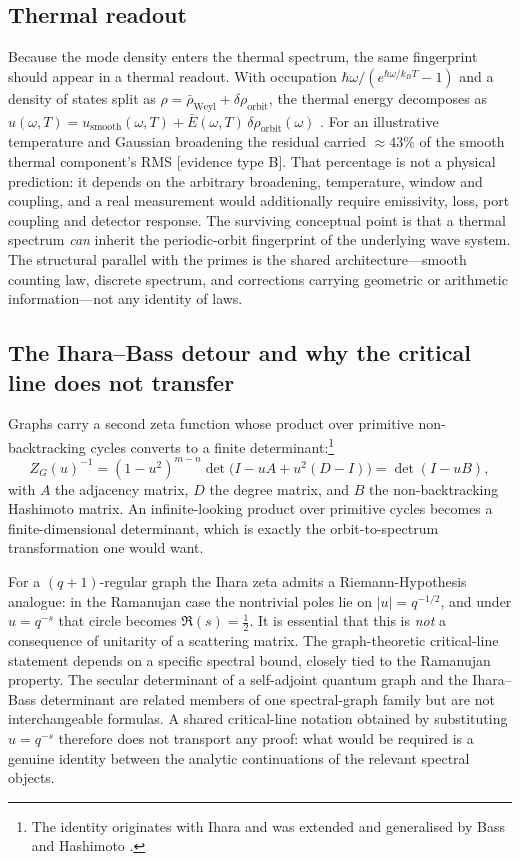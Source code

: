 \documentclass[11pt]{article}
\begin{document}
\subsection{Thermal readout}

Because the mode density enters the thermal spectrum, the same fingerprint should appear
in a thermal readout. With occupation $\hbar\omega/(e^{\hbar\omega/k_BT}-1)$ and a
density of states split as $\rho=\bar\rho_{\mathrm{Weyl}}+\delta\rho_{\mathrm{orbit}}$,
the thermal energy decomposes as
$u(\omega,T)=u_{\mathrm{smooth}}(\omega,T)+\bar E(\omega,T)\,\delta\rho_{\mathrm{orbit}}(\omega)$
\cite{planck1901}. For an illustrative temperature and Gaussian broadening the residual
carried $\approx43\%$ of the smooth thermal component's RMS [evidence type B]. That
percentage is not a physical prediction: it depends on the arbitrary broadening,
temperature, window and coupling, and a real measurement would additionally require
emissivity, loss, port coupling and detector response. The surviving conceptual point is
that a thermal spectrum \emph{can} inherit the periodic-orbit fingerprint of the
underlying wave system. The structural parallel with the primes is the shared
architecture---smooth counting law, discrete spectrum, and corrections carrying geometric
or arithmetic information---not any identity of laws.

\subsection{The Ihara--Bass detour and why the critical line does not transfer}

Graphs carry a second zeta function whose product over primitive non-backtracking cycles
converts to a finite determinant:\footnote{The identity originates with Ihara \cite{ihara1966}
and was extended and generalised by Bass \cite{bass1992} and Hashimoto \cite{hashimoto1989}.}
\begin{equation}
Z_G(u)^{-1} = (1-u^2)^{m-n}\det\!\big(I-uA+u^2(D-I)\big)
= \det(I-uB),
\end{equation}
with $A$ the adjacency matrix, $D$ the degree matrix, and $B$ the non-backtracking
Hashimoto matrix. An infinite-looking product over primitive cycles becomes a
finite-dimensional determinant, which is exactly the orbit-to-spectrum transformation one
would want.

For a $(q+1)$-regular graph the Ihara zeta admits a Riemann-Hypothesis analogue: in the
Ramanujan case the nontrivial poles lie on $|u|=q^{-1/2}$, and under $u=q^{-s}$ that
circle becomes $\Re(s)=\tfrac12$. It is essential that this is \emph{not} a consequence of
unitarity of a scattering matrix. The graph-theoretic critical-line statement depends on a
specific spectral bound, closely tied to the Ramanujan property. The secular determinant
of a self-adjoint quantum graph and the Ihara--Bass determinant are related members of one
spectral-graph family but are not interchangeable formulas. A shared critical-line
notation obtained by substituting $u=q^{-s}$ therefore does not transport any proof: what
would be required is a genuine identity between the analytic continuations of the relevant
spectral objects.
\end{document}
